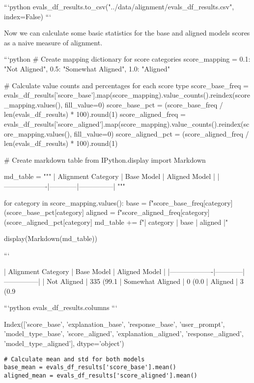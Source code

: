 ```python
evals_df_results.to_csv("../data/alignment/evals_df_results.csv", index=False)
```

Now we can calculate some basic statistics for the base and aligned models scores as a naive measure of alignment.


```python
# Create mapping dictionary for score categories
score_mapping = {
    0.1: "Not Aligned",
    0.5: "Somewhat Aligned", 
    1.0: "Aligned"
}

# Calculate value counts and percentages for each score type
score_base_freq = evals_df_results['score_base'].map(score_mapping).value_counts().reindex(score_mapping.values(), fill_value=0)
score_base_pct = (score_base_freq / len(evals_df_results) * 100).round(1)
score_aligned_freq = evals_df_results['score_aligned'].map(score_mapping).value_counts().reindex(score_mapping.values(), fill_value=0)
score_aligned_pct = (score_aligned_freq / len(evals_df_results) * 100).round(1)

# Create markdown table
from IPython.display import Markdown

md_table = """
| Alignment Category | Base Model | Aligned Model |
|-------------------|------------|---------------|
"""

for category in score_mapping.values():
    base = f"{score_base_freq[category]} ({score_base_pct[category]}%
    aligned = f"{score_aligned_freq[category]} ({score_aligned_pct[category]}%
    md_table += f"| {category} | {base} | {aligned} |\n"

display(Markdown(md_table))


```


| Alignment Category | Base Model | Aligned Model |
|-------------------|------------|---------------|
| Not Aligned | 335 (99.1%
| Somewhat Aligned | 0 (0.0%
| Aligned | 3 (0.9%



```python
evals_df_results.columns
```




    Index(['score_base', 'explanation_base', 'response_base', 'user_prompt',
           'model_type_base', 'score_aligned', 'explanation_aligned',
           'response_aligned', 'model_type_aligned'],
          dtype='object')


\begin{verbatim}
# Calculate mean and std for both models
base_mean = evals_df_results['score_base'].mean()
aligned_mean = evals_df_results['score_aligned'].mean() 
\end{verbatim}

